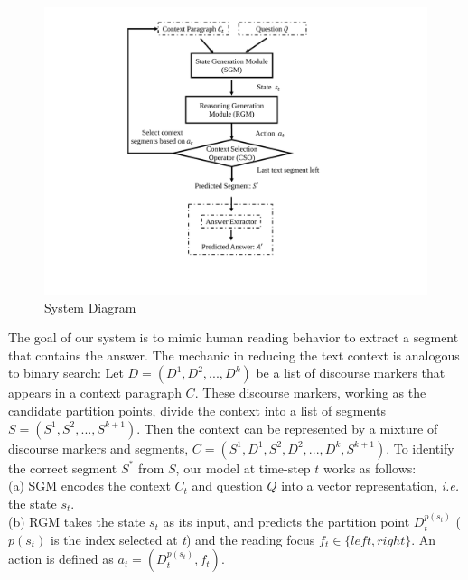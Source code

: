 \begin{figure}
\begin{minipage}{.45\textwidth}
 \centering
 \includegraphics[width=0.9\linewidth]{fig/fig1.pdf}
 \caption{System Diagram}
 \label{fig:systemDiagram}
\end{minipage}
\vspace{-2ex}
\end{figure}
\label{sec2description}
The goal of our system is to mimic human reading behavior to extract a segment that
contains the answer. The mechanic in reducing the text context is analogous to binary search: Let $D=(D^1,D^2,...,D^k)$ be a list of discourse markers that appears in a context paragraph $C$. These discourse markers, working as the candidate partition points, divide the context into a list of segments $S=(S^1,S^2,...,S^{k+1})$. Then the context can be represented by a mixture of discourse markers and segments, $C=(S^1, D^1, S^2, D^2,...,D^k, S^{k+1})$. To identify the correct segment $S^*$ from $S$, our model at time-step $t$ works as follows:\\
(a) SGM encodes the context $C_t$ and question $Q$ into a vector representation, \emph{i.e.} the state $s_t$.\\
(b) RGM takes the state $s_t$ as its input, and predicts the partition point $D^{p(s_t)}_t$ (${p(s_t)}$ is the index selected at \emph{t}) and the reading focus $f_t \in \{left, right\}$. An action is defined as $a_t=(D^{p(s_t)}_t,f_t)$. \\
